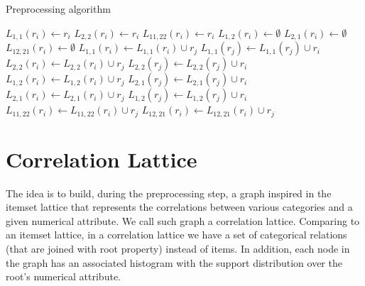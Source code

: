\begin{algorithm}[h!]
  \caption{Preprocessing algorithm}

     {
      $L_{1,1}(r_i) \leftarrow r_i$\;
      $L_{2,2}(r_i) \leftarrow r_i$\;
      $L_{11,22}(r_i) \leftarrow r_i$\;
      $L_{1,2}(r_i) \leftarrow \emptyset$\;
      $L_{2,1}(r_i) \leftarrow \emptyset$\;
      $L_{12,21}(r_i) \leftarrow \emptyset$\;
    }
     {
	 {
	     {
		$L_{1,1}(r_i) \leftarrow L_{1,1}(r_i) \cup r_j$\;
		$L_{1,1}(r_j) \leftarrow L_{1,1}(r_j) \cup r_i$\;
	    }
	     {
		$L_{2,2}(r_i) \leftarrow L_{2,2}(r_i) \cup r_j$\;
		$L_{2,2}(r_j) \leftarrow L_{2,2}(r_j) \cup r_i$\;
	    }
	     {
		$L_{1,2}(r_i) \leftarrow L_{1,2}(r_i) \cup r_j$\;
		$L_{2,1}(r_j) \leftarrow L_{2,1}(r_j) \cup r_i$\;
	    }
	     {
		$L_{2,1}(r_i) \leftarrow L_{2,1}(r_i) \cup r_j$\;
		$L_{1,2}(r_j) \leftarrow L_{1,2}(r_j) \cup r_i$\;
	    }
	}
   }
    {
	 {
	     {
		$L_{11,22}(r_i) \leftarrow L_{11,22}(r_i) \cup r_j$\;
	    }
	}
	 {
	     {
		$L_{12,21}(r_i) \leftarrow L_{12,21}(r_i) \cup r_j$\;
	    }
	}
   }
  \label{alg3}
\end{algorithm}

\subsection{}

\section{Correlation Lattice}
\label{sec:correlation-lattice}

The idea is to build, during the preprocessing step, a graph inspired in the itemset lattice that represents the
correlations between various categories and a given numerical attribute. We call such graph a
correlation lattice.
Comparing to an itemset lattice, in a correlation lattice we have a set of categorical relations (that are joined with
root property) instead of items. In addition, each node in the graph has an associated histogram with the support
distribution over the root's numerical attribute.

